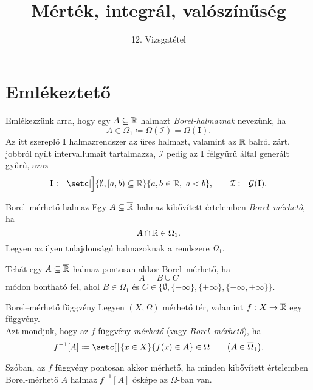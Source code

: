 \documentclass[
]{elteikthesis}[2024/04/26]
\title{Mérték, integrál, valószínűség} %
\subtitle{12. Vizsgatétel}
\begin{document}
	
	
	\section{Emlékeztető}
	
	Emlékezzünk arra, hogy egy \( A \subseteq \mathbb{R} \) halmazt \emph{Borel-halmaznak} nevezünk, ha
	\[
		A \in \Omega_1 \coloneq \Omega( \mathcal{I} ) = \Omega( \mathbf{I} ).
	\]
	Az itt szereplő \( \mathbf{I} \) halmazrendszer az üres halmazt, 
	valamint az \( \mathbb{R} \) balról zárt, jobbról nyílt intervallumait tartalmazza,
	\( \mathcal{I} \) pedig az \( \mathbf{I} \) félgyűrű által generált gyűrű, azaz
	\[
		\mathbf{I} \coloneq 
		\setc[\Big]{ \emptyset, [a, b) \subseteq \R }{ a, b \in \R, \ a < b }, \qquad
		\mathcal{I} \coloneq
		\mathcal{G}( \mathbf{I} ).
	\]
	\begin{definition}{Borel--mérhető halmaz}{}
		Egy \( A \subseteq \overline{\mathbb{R}} \) halmaz 
		kibővített értelemben \emph{Borel--mérhető}, ha
		\[
			A \cap \mathbb{R} \in \Omega_1.
		\]
		Legyen az ilyen tulajdonságú halmazoknak a rendszere \( \overline{\Omega}_1 \).
	\end{definition}
	
	\begin{note}
		Tehát egy \( A \subseteq \overline{ \mathbb{R} } \) halmaz pontosan akkor Borel--mérhető, ha
		\[
			A = B \cup C
		\]
		módon bontható fel, ahol \( B \in \Omega_1 \) és 
		\( C \in \bigl\{ \emptyset, \{ -\infty \}, \{ +\infty \}, \{ -\infty, +\infty \} \bigr\} \).
	\end{note}
	
	\begin{definition}{Borel--mérhető függvény}{}
		Legyen \( (X, \Omega) \) mérhető tér, 
		valamint \( f \,\colon X \to \overline{\mathbb{R}} \) egy függvény.\\[3pt]
		Azt mondjuk, hogy az \( f \) függvény \emph{mérhető} (vagy \emph{Borel--mérhető}), ha
		\[
		f^{-1}[A] \coloneq
		\setc[\big]{ x \in X }{ f(x) \in A } \in \Omega
		\qquad \bigl( A \in \overline{\Omega}_1 \bigr).
		\]
	\end{definition}
	\begin{note}
		Szóban, az \( f \) függvény pontosan akkor mérhető, 
		ha minden kibővített értelemben Borel-mérhető \( A \)
		halmaz \( f^{-1}[A] \) ősképe az \( \Omega \)-ban van.
	\end{note}
	
\end{document}
